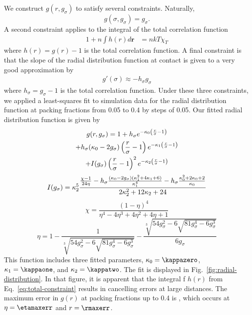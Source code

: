 \documentclass[letterpaper,twocolumn,amsmath,amssymb,pre,aps,10pt]{revtex4-1}
\newcommand{\rr}{\textbf{r}}
\begin{document}
We construct $g(r, g_\sigma)$ to satisfy several constraints.  Naturally,
\begin{equation}
  g(\sigma, g_\sigma) = g_\sigma.
\end{equation}
A second constraint applies to the integral of the total correlation
function
\begin{align}
  1 + n\int h(r)d\rr &= nkT\chi_T \label{eq:total-constraint}
\end{align}
where $h(r) = g(r) - 1$ is the total correlation function.
A final constraint is that the slope of the radial distribution
function at contact is given to a very good approximation by
\begin{align}
  g'(\sigma) \approx - h_\sigma g_\sigma
\end{align}
where $h_\sigma = g_\sigma - 1$ is the total correlation function.
Under these three constraints, we applied a least-squares fit to
simulation data for the radial distribution function at packing
fractions from 0.05 to 0.4 by steps of 0.05.  Our fitted radial
distribution function is given by
\begin{multline}
  g(r,g_\sigma) = 1 + h_\sigma e^{-\kappa_0 \left(\frac{r}{\sigma}-1\right)} \\
  + h_\sigma(\kappa_0 - 2g_\sigma)  \left(\frac{r}{\sigma}-1\right)e^{-\kappa_1  \left(\frac{r}{\sigma}-1\right)} \\
  + I(g_\sigma)  \left(\frac{r}{\sigma}-1\right)^2e^{-\kappa_2  \left(\frac{r}{\sigma}-1\right)}
\end{multline}
\begin{equation}
  I(g_\sigma) = \kappa_2^5 \frac{
    \frac{\chi-1}{24\eta} - h_\sigma \frac{(\kappa_0-2
      g_\sigma)(\kappa_1^2 + 4 \kappa_1 + 6)}{\kappa_1^4}
    - h_\sigma\frac{\kappa_0^2 + 2\kappa_0 + 2}{\kappa_0}
  }{2 \kappa_2^2 + 12 \kappa_2 + 24}
\end{equation}
\begin{equation}
  \chi = \frac{(1-\eta)^4}{\eta^4 - 4\eta^3 + 4\eta^2 + 4\eta + 1}
\end{equation}
\newcommand\nastyetacuberoot{\sqrt[3]{54 g_\sigma^2 -
    6\sqrt{81g_\sigma^4 - 6g_\sigma^3}}}
\begin{equation}
  \eta = 1 - \frac{1}{\nastyetacuberoot} - \frac{\nastyetacuberoot}{6g_\sigma}
\end{equation}
This function includes three fitted parameters, $\kappaO =
\kappazero$, $\kappaI = \kappaone$,
and $\kappaZ = \kappatwo$.
The fit is displayed in Fig.~\ref{fig:radial-distribution}.  In that
figure, it is apparent that the integral f $h(r)$ from
Eq.~\ref{eq:total-constraint} results in cancelling errors at large
distances.  The maximum error in $g(r)$ at packing fractions up to
0.4 is \maxerr, which occurs at $\eta = \etamaxerr$ and $r =
\rmaxerr$.
\end{document}
